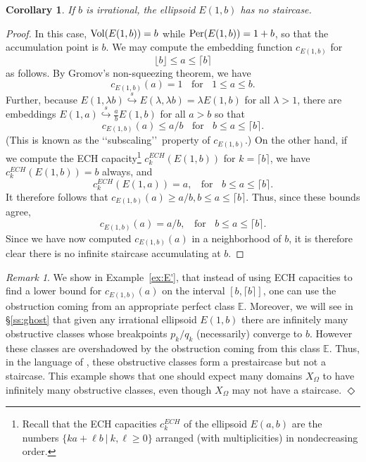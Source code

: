 \documentclass[11pt, reqno]{amsart}
\newtheorem{cor}[thm]{Corollary}
\theoremstyle{remark}
\numberwithin{equation}{subsection}
\numberwithin{figure}{section}
\theoremstyle{customremark}
\newtheorem{rmk_no_diamond}[thm]{Remark}
\newenvironment{rmk}{\begin{rmk_no_diamond} } {\hfill$\er$ \end{rmk_no_diamond}}
\newcommand{\se}{{\stackrel{s}\hookrightarrow}}
\newcommand{\Vol}{{\rm Vol}}
\newcommand{\Per}{{\rm Per}}
\newcommand{\bE}{{\mathbb E}}
\newcommand{\Om}{{\Omega}}
\newcommand{\la}{{\lambda}}
\newcommand{\er}{{\Diamond}}
\begin{document}
\begin{cor}\label{cor:ellip} If $b$ is irrational, the ellipsoid $E(1,b)$ has no staircase.
\end{cor}

\begin{proof}
In this case, $\Vol(E(1,b)) = b$ while $\Per(E(1,b))= 1+b$, so that the
 accumulation point  is $b$.   We may 
compute the embedding function $c_{E(1,b)}$ for 
$$
   \lfloor{b}\rfloor \le a \le \lceil{b}\rceil
$$
as follows.
By Gromov's non-squeezing theorem, we have
$$
   c_{E(1,b)}(a) = 1 \;\;\mbox{ for }\;\;  1 \le a \le b.
$$
Further, because  $E(1,\la b)\se E(\la,\la b) = \la E(1,b)$ for 
all $\la > 1$, there are embeddings $E(1,a)\se \frac ab E(1,b)$ for all $a>b$ so that
$$
   c_{E(1,b)}(a) \le a/b \;\;\mbox{ for }\;\; b \le a \le  \lceil{b}\rceil.
$$
(This is known as the  \lq\lq subscaling\rq\rq\, property of $c_{E(1,b)}$.)
On the other hand, if we compute the ECH capacity\footnote
{
Recall that the ECH capacities $c^{ECH}_k$ of the ellipsoid $E(a,b)$ are the numbers $\{ka + \ell b \ | \ k,\ell\ge 0\}$ arranged (with multiplicities) in nondecreasing order.}
$c^{ECH}_k(E(1,b)) $ for $k =  \lceil{b}\rceil$, we have $c^{ECH}_k(E(1,b)) = b$ always, and  
$$
     c^{ECH}_k(E(1,a)) = a, \;\;\mbox{ for }\;\; b \le a \le  \lceil{b}\rceil.
$$
It therefore follows that $c_{E(1,b)}(a) \ge a/b, b \le a \le  \lceil{b}\rceil$.  Thus, since these bounds agree, 
$$
  c_{E(1,b)}(a) = a/b ,\;\;\mbox{ for }\;\;  b \le a \le  \lceil{b}\rceil.
$$
Since we have now computed $c_{E(1,b)}(a)$ in a neighborhood of $b$, it is therefore clear there is no infinite staircase accumulating at $b$.
\end{proof}

\begin{rmk}\rm  We show in Example~\ref{ex:E'}, that instead of using ECH capacities to find a lower bound for $c_{E(1,b)}(a)$ on the interval $[b, \lceil{b}\rceil]$, one can use the obstruction coming from an appropriate  perfect class $\bE$.
Moreover, we  will see  in \S\ref{ss:ghost} that given any irrational ellipsoid $E(1,b)$ there are infinitely many obstructive classes whose breakpoints $p_k/q_k$ (necessarily) converge to $b$. However these classes are overshadowed by the obstruction coming from this class $\bE$. Thus, in the language of \cite{MMW},  these obstructive classes form a prestaircase but not a staircase. This example shows that one should expect many domains $X_\Om$ to have infinitely many obstructive classes, even though $X_\Om$ may not have a staircase.
\end{rmk}
\end{document}
